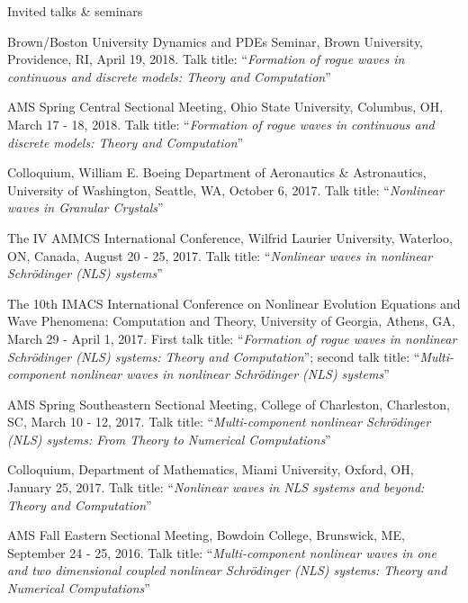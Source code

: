 \documentclass[10pt]{article} %
\begin{document}
\begin{section}{Invited talks \& seminars}
\begin{etaremune}
\item   Brown/Boston University Dynamics and PDEs Seminar, Brown University, Providence, RI, April 19, 2018.
        Talk title: ``\textit{Formation of rogue waves in continuous and discrete models: Theory and Computation}''

\item   AMS Spring Central Sectional Meeting, Ohio State University, Columbus, OH, March 17 - 18, 2018.
        Talk title: ``\textit{Formation of rogue waves in continuous and discrete models: Theory and Computation}''                
                     
\item   Colloquium, William E. Boeing Department of Aeronautics \& Astronautics, University of Washington, Seattle, WA, October 6, 2017.
        Talk title: ``\textit{Nonlinear waves in Granular Crystals}''
    
\item   The IV AMMCS International Conference, Wilfrid Laurier University, Waterloo, ON, Canada, August 20 - 25, 2017. 
        Talk title: ``\textit{Nonlinear waves in nonlinear Schr\"odinger (NLS) systems}''

\item   The 10th IMACS International Conference on Nonlinear Evolution Equations and Wave Phenomena: Computation and Theory, %
        University of Georgia, Athens, GA, March 29 - April 1, 2017. 
        First talk title: ``\textit{Formation of rogue waves in nonlinear Schr\"odinger (NLS) systems: Theory and Computation}'';      
        second talk title: ``\textit{Multi-component nonlinear waves in nonlinear Schr\"odinger (NLS) systems}''
         
\item   AMS Spring Southeastern Sectional Meeting, College of Charleston, Charleston, SC, March 10 - 12, 2017.
        Talk title: ``\textit{Multi-component nonlinear Schr\"odinger (NLS) systems: From Theory to Numerical Computations}''   

\item   Colloquium, Department of Mathematics, Miami University, Oxford, OH, January 25, 2017.
        Talk title: ``\textit{Nonlinear waves in NLS systems and beyond: Theory and Computation}''

\item   AMS Fall Eastern Sectional Meeting, Bowdoin College, Brunswick, ME, September 24 - 25, 2016.
        Talk title: ``\textit{Multi-component nonlinear waves in one and two dimensional coupled nonlinear
        Schr\"odinger (NLS) systems: Theory and Numerical Computations}''
    

\end{etaremune}
\end{section}
\end{document}

